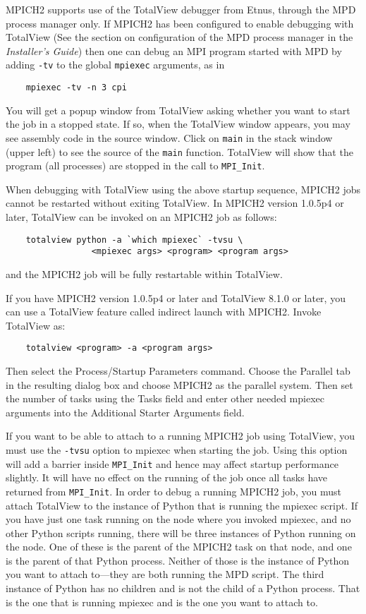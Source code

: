 \documentclass[dvipdfm,11pt]{article}
\begin{document}
MPICH2 supports use of the TotalView debugger from Etnus, through the
MPD process manager only.  If 
MPICH2 has been configured to enable debugging with TotalView
(See the section on configuration of the MPD process manager in the
\emph{Installer's Guide}) then one can debug an MPI program started
with MPD by adding \texttt{-tv} to the global \texttt{mpiexec}
arguments, as in
\begin{verbatim}
    mpiexec -tv -n 3 cpi
\end{verbatim}
You will get a popup window from TotalView asking whether you want to
start the job in a stopped state.  If so,
when the TotalView window appears, you may see assembly code in the
source window.  Click on \texttt{main} in the stack window (upper left)
to see the source of the \texttt{main} function.  TotalView will show
that the program (all processes) are stopped in the call to
\texttt{MPI\_Init}. 

When debugging with TotalView using the above startup sequence, MPICH2
jobs cannot be restarted without exiting TotalView. In MPICH2 version
1.0.5p4 or later, TotalView can be invoked on an MPICH2 job as follows: 
\begin{verbatim}
    totalview python -a `which mpiexec` -tvsu \
                 <mpiexec args> <program> <program args>
\end{verbatim}
and the MPICH2 job will be fully restartable within TotalView.

If you have MPICH2 version 1.0.5p4 or later and TotalView 8.1.0 or later,
you can use a TotalView feature called indirect launch with
MPICH2. Invoke TotalView as: 
\begin{verbatim}
    totalview <program> -a <program args>
\end{verbatim}
Then select the Process/Startup Parameters command. Choose the
Parallel tab in the resulting dialog box and choose MPICH2 as the
parallel system. Then set the number of tasks using the Tasks field 
and enter other needed mpiexec arguments into the Additional
Starter Arguments field.  

If you want to be able to attach to a running MPICH2 job using
TotalView, you must use the \texttt{-tvsu} option to mpiexec when
starting the job. Using this option will add a barrier inside
\texttt{MPI\_Init} and hence may affect startup performance slightly. It
will have no effect on the running of the job once all tasks have
returned from \texttt{MPI\_Init}. In order to debug a running MPICH2
job, you must attach TotalView to the instance of Python that is
running the mpiexec script. If you have just one task running on the
node where you invoked mpiexec, and no other Python scripts running,
there will be three instances of Python running on the node. One of
these is the parent of the MPICH2 task on that node, and one is the
parent of that Python process. Neither of those is the instance of Python you
want to attach to---they are both running the MPD script. The third
instance of Python has no children and is not the child of a
Python process. That is the one that is running mpiexec and is the one you
want to attach to.
\end{document}
